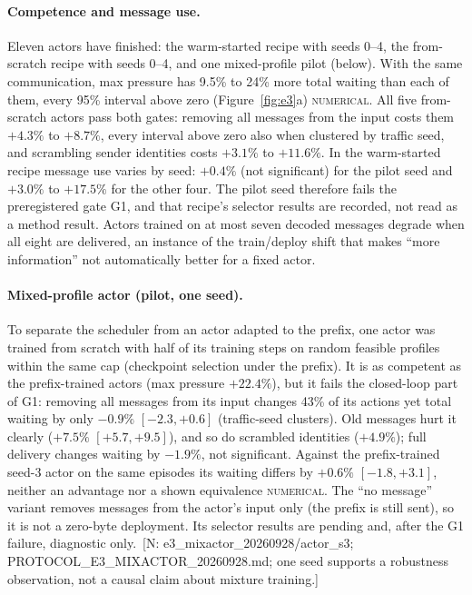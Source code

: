 \documentclass[11pt]{article}
\theoremstyle{definition}
\newcommand{\NUM}{\textsc{numerical}}
\newif\ifshownotes\shownotestrue
\newcommand{\NOTE}[1]{\ifshownotes{\color{notecol}\,\textsf{\footnotesize[N: #1]}}\fi}
\begin{document}
\paragraph{Competence and message use.} Eleven actors have finished: the warm-started recipe with seeds
0--4, the from-scratch recipe with seeds 0--4, and one mixed-profile pilot (below). With the same
communication, max pressure has 9.5\% to 24\% more total waiting than each of them, every 95\% interval
above zero (Figure~\ref{fig:e3}a) \NUM. All five from-scratch actors pass both gates: removing all
messages from the input costs them $+4.3\%$ to $+8.7\%$, every interval above zero also when clustered
by traffic seed, and scrambling sender identities costs $+3.1\%$ to $+11.6\%$.
In the warm-started recipe message use varies by seed: $+0.4\%$ (not significant) for the pilot seed
and $+3.0\%$ to $+17.5\%$ for the other four. The pilot seed therefore fails the preregistered gate G1,
and that recipe's selector results are recorded, not read as a method result. Actors trained on at most
seven decoded messages degrade when all eight are delivered, an instance of the train/deploy shift that
makes ``more information'' not automatically better for a fixed actor.

\paragraph{Mixed-profile actor (pilot, one seed).} To separate the scheduler from an actor adapted to
the prefix, one actor was trained from scratch with half of its training steps on random feasible
profiles within the same cap (checkpoint selection under the prefix). It is as competent as the
prefix-trained actors (max pressure $+22.4\%$), but it fails the closed-loop part of G1: removing all
messages from its input changes 43\% of its actions yet total waiting by only $-0.9\%$ $[-2.3,+0.6]$
(traffic-seed clusters). Old messages hurt it clearly ($+7.5\%$ $[+5.7,+9.5]$), and so do scrambled
identities ($+4.9\%$); full delivery changes waiting by $-1.9\%$, not significant. Against the
prefix-trained seed-3 actor on the same episodes its waiting differs by $+0.6\%$ $[-1.8,+3.1]$, neither
an advantage nor a shown equivalence \NUM. The ``no message'' variant removes messages from the actor's
input only (the prefix is still sent), so it is not a zero-byte deployment. Its selector results are
pending and, after the G1 failure, diagnostic only.
\NOTE{e3\_mixactor\_20260928/actor\_s3; PROTOCOL\_E3\_MIXACTOR\_20260928.md; one seed supports a
robustness observation, not a causal claim about mixture training.}
\end{document}
